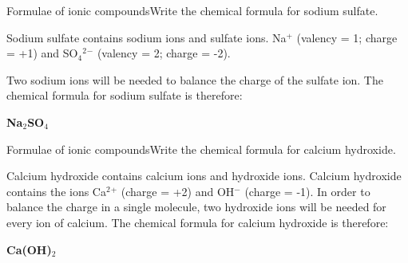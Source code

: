 \begin{wex}{Formulae of ionic compounds}{Write the chemical formula for sodium sulfate.\\}
{
Sodium sulfate contains sodium ions and sulfate ions.
Na$^+$ (valency = 1; charge = +1) and SO$_4$$^2$$^-$ (valency = 2; charge = -2). 

Two sodium ions will be needed to balance the charge of the sulfate ion. The chemical formula for sodium sulfate is therefore: 

\begin{center}
\textbf{Na$_2$SO$_4$}
\end{center}}
\end{wex}

\begin{wex}{Formulae of ionic compounds}{Write the chemical formula for calcium hydroxide.\\}
{
Calcium hydroxide contains calcium ions and hydroxide ions.
Calcium hydroxide contains the ions Ca$^2$$^+$ (charge = +2) and OH$^-$ (charge = -1). In order to balance the charge in a single molecule, two hydroxide ions will be needed for every ion of calcium. 
The chemical formula for calcium hydroxide is therefore: 

\begin{center}
\textbf{Ca(OH)$_2$}
\end{center}}
\end{wex}

